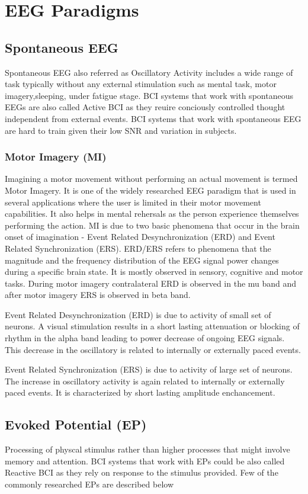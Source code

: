 \section{EEG Paradigms}

\subsection{Spontaneous EEG}
Spontaneous EEG also referred as Oscillatory Activity includes a wide range of task typically without any external stimulation such as mental task, motor imagery,sleeping, 
under fatigue stage. BCI systems that work with spontaneous EEGs are also called Active BCI as they reuire conciously controlled thought independent from external events.
BCI systems that work with spontaneous EEG are hard to train given their low SNR and variation in subjects.

    \subsubsection{Motor Imagery (MI)}
Imagining a motor movement without performing an actual movement is termed Motor Imagery. It is one of the widely researched EEG paradigm that is used in several applications
where the user is limited in their motor movement capabilities. It also helps in mental rehersals as the person experience themselves performing the action. MI is due to
two basic phenomena that occur in the brain onset of imagination - Event Related Desynchronization (ERD) and Event Related Synchronization (ERS). ERD/ERS refers to 
phenomena that the magnitude and the frequency distribution of the EEG signal power changes during a specific brain state. It is mostly observed in sensory, cognitive
and motor tasks. During motor imagery contralateral ERD is observed in the mu band and after motor imagery ERS is observed in beta band.

Event Related Desynchronization (ERD) is due to activity of small set of neurons. A visual stimulation results in a short lasting attenuation or blocking of rhythm in the alpha 
band leading to power decrease of ongoing EEG signals. This decrease in the oscillatory is related to internally or externally paced events.

Event Related Synchronization (ERS) is due to activity of large set of neurons. The increase in oscillatory activity is again related to internally or externally paced events.
It is characterized by short lasting amplitude enchancement.

\subsection{Evoked Potential (EP)}
Processing of physcal stimulus rather than higher processes that might involve memory and attention. BCI systems that work with EPs could be also called Reactive BCI as they
rely on response to the stimulus provided. Few of the commonly researched EPs are described below

